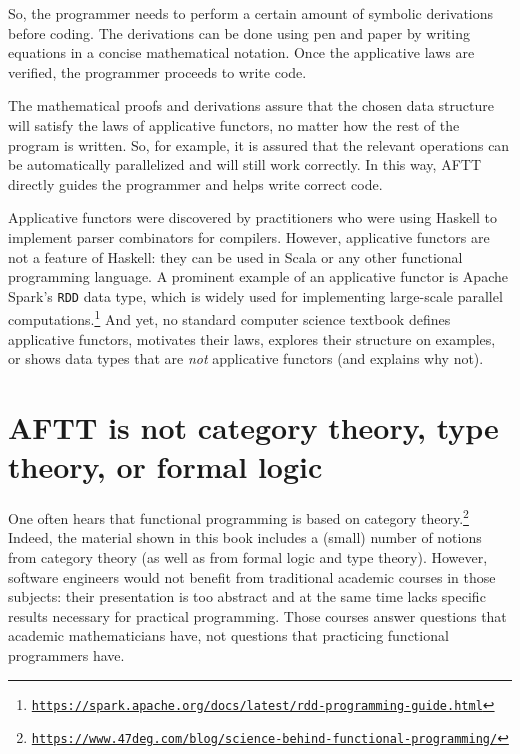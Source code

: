 So, the programmer needs to perform a certain amount of symbolic derivations
before coding. The derivations can be done using pen and paper by
writing equations in a concise mathematical notation. Once the applicative
laws are verified, the programmer proceeds to write code.

The mathematical proofs and derivations assure that the chosen data
structure will satisfy the laws of applicative functors, no matter
how the rest of the program is written. So, for example, it is assured
that the relevant operations can be automatically parallelized and
will still work correctly. In this way, AFTT directly guides the programmer
and helps write correct code.

Applicative functors were discovered by practitioners who were using
Haskell to implement parser combinators for compilers. However, applicative
functors are not a feature of Haskell: they can be used in Scala or
any other functional programming language. A prominent example of
an applicative functor is Apache Spark\textsf{'}s \lstinline!RDD! data type,
which is widely used for implementing large-scale parallel computations.\footnote{\texttt{\href{https://spark.apache.org/docs/latest/rdd-programming-guide.html}{https://spark.apache.org/docs/latest/rdd-programming-guide.html}}}
And yet, no standard computer science textbook defines applicative
functors, motivates their laws, explores their structure on examples,
or shows data types that are \emph{not} applicative functors (and
explains why not). 

\section{AFTT is not category theory, type theory, or formal logic}

One often hears that functional programming is based on category theory.\footnote{\texttt{\href{https://www.47deg.com/blog/science-behind-functional-programming/}{https://www.47deg.com/blog/science-behind-functional-programming/}}}
Indeed, the material shown in this book includes a (small) number
of notions from category theory (as well as from formal logic and
type theory). However, software engineers would not benefit from traditional
academic courses in those subjects: their presentation is too abstract
and at the same time lacks specific results necessary for practical
programming. Those courses answer questions that academic mathematicians
have, not questions that practicing functional programmers have.

